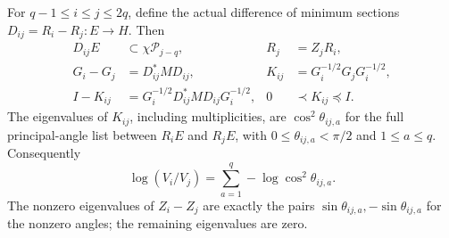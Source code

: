 \documentclass{article}
\newcommand{\cP}{\mathcal P}
\begin{document}
\begin{theorem}
For $q-1\le i\le j\le2q$, define the actual difference of
minimum sections $D_{ij}=R_i-R_j:E\to H$. Then
\[
 \begin{aligned}
 D_{ij}E&\subset\chi\cP_{j-q},& R_j&=Z_jR_i,\\
 G_i-G_j&=D_{ij}^*M D_{ij},&
 K_{ij}&=G_i^{-1/2}G_jG_i^{-1/2},\\
 I-K_{ij}&=G_i^{-1/2}D_{ij}^*M D_{ij}G_i^{-1/2},&
 0&\prec K_{ij}\preceq I.
 \end{aligned}
 \tag{AGT5}
\]
The eigenvalues of $K_{ij}$, including multiplicities, are
$\cos^2\theta_{ij,a}$ for the full principal-angle list between
$R_iE$ and $R_jE$, with $0\le\theta_{ij,a}<\pi/2$ and
$1\le a\le q$. Consequently
\[
 \log(V_i/V_j)=\sum_{a=1}^q-\log\cos^2\theta_{ij,a}.
 \tag{AGT6}
\]
The nonzero eigenvalues of $Z_i-Z_j$ are exactly the pairs
$\sin\theta_{ij,a},-\sin\theta_{ij,a}$ for the nonzero angles;
the remaining eigenvalues are zero.
\end{theorem}
\end{document}
